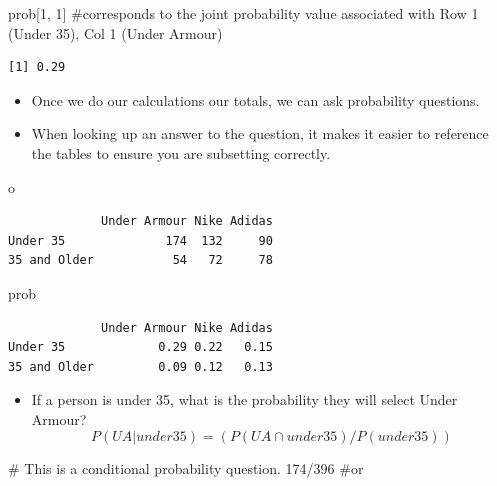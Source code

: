 \documentclass[
  letterpaper,
  DIV=11,
  numbers=noendperiod]{scrreprt}
\newenvironment{Shaded}{\begin{snugshade}}{\end{snugshade}}
\newcommand{\CommentTok}[1]{\textcolor[rgb]{0.37,0.37,0.37}{#1}}
\newcommand{\DecValTok}[1]{\textcolor[rgb]{0.68,0.00,0.00}{#1}}
\newcommand{\NormalTok}[1]{\textcolor[rgb]{0.00,0.23,0.31}{#1}}
\newcommand{\SpecialCharTok}[1]{\textcolor[rgb]{0.37,0.37,0.37}{#1}}
\providecommand{\tightlist}{%
  \setlength{\itemsep}{0pt}\setlength{\parskip}{0pt}}\usepackage{longtable,booktabs,array}
\begin{document}
\begin{Shaded}
\begin{Highlighting}[]
\NormalTok{prob[}\DecValTok{1}\NormalTok{, }\DecValTok{1}\NormalTok{]  }\CommentTok{\#corresponds to the joint probability value associated with Row 1 (Under 35), Col 1 (Under Armour)}
\end{Highlighting}
\end{Shaded}

\begin{verbatim}
[1] 0.29
\end{verbatim}

\begin{itemize}
\item
  Once we do our calculations our totals, we can ask probability
  questions.
\item
  When looking up an answer to the question, it makes it easier to
  reference the tables to ensure you are subsetting correctly.
\end{itemize}

\begin{Shaded}
\begin{Highlighting}[]
\NormalTok{o}
\end{Highlighting}
\end{Shaded}

\begin{verbatim}
             Under Armour Nike Adidas
Under 35              174  132     90
35 and Older           54   72     78
\end{verbatim}

\begin{Shaded}
\begin{Highlighting}[]
\NormalTok{prob}
\end{Highlighting}
\end{Shaded}

\begin{verbatim}
             Under Armour Nike Adidas
Under 35             0.29 0.22   0.15
35 and Older         0.09 0.12   0.13
\end{verbatim}

\begin{itemize}
\tightlist
\item
  If a person is under 35, what is the probability they will select
  Under Armour? \[P(UA|under35) = (P(UA \cap under35)/P(under35))\]
\end{itemize}

\begin{Shaded}
\begin{Highlighting}[]
\CommentTok{\# This is a conditional probability question.}
\DecValTok{174}\SpecialCharTok{/}\DecValTok{396}  \CommentTok{\#or}
\end{Highlighting}
\end{Shaded}
\end{document}
